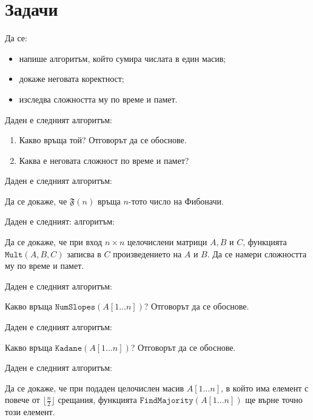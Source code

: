 \section{Задачи}

\begin{problem}
Да се:
\begin{itemize}
    \item напише алгоритъм, който сумира числата в един масив;
    \item докаже неговата коректност;
    \item изследва сложността му по време и памет.
\end{itemize}
\end{problem}

\begin{problem}
Даден е следният алгоритъм:


\begin{enumerate}
    \item Какво връща той? Отговорът да се обоснове.
    \item Каква е неговата сложност по време и памет?
\end{enumerate}
\end{problem}

\begin{problem}
Даден е следният алгоритъм:


Да се докаже, че $\mathfrak{F}(n)$ връща $n$-тото число на Фибоначи.
\end{problem}

\begin{problem}
Даден е следният: алгоритъм:


Да се докаже, че при вход $n \times n$ целочислени матрици $A, B$ и $C$, функцията $\mathtt{Mult}(A, B, C)$ записва в $C$ произведението на $A$ и $B$.
Да се намери сложността му по време и памет.
\end{problem}

\begin{problem}
Даден е следният алгоритъм:


Какво връща $\mathtt{NumSlopes}(A[1 \dots n])$?
Отговорът да се обоснове.
\end{problem}

\begin{problem}
Даден е следният алгоритъм:


Какво връща $\mathtt{Kadane}(A[1 \dots n])$?
Отговорът да се обоснове.
\end{problem}

\begin{problem}
Даден е следният алгоритъм:


Да се докаже, че при подаден целочислен масив $A[1 \dots n]$, в който има елемент с повече от $\lfloor \frac{n}{2} \rfloor$ срещания,
функцията $\mathtt{FindMajority}(A[1 \dots n])$ ще върне точно този елемент.
\end{problem}
